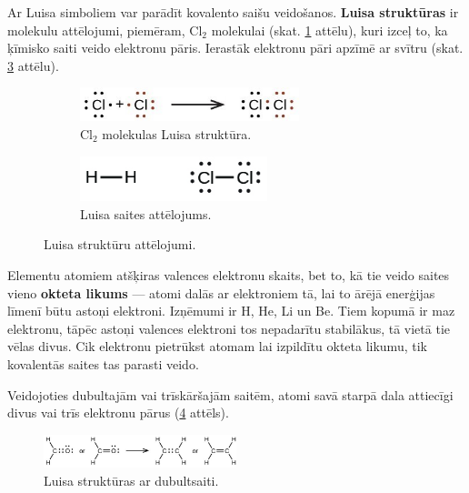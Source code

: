 \documentclass[12pt,a4paper]{article}
\newcommand{\figref}[1]{\ref{#1} attēls}
\begin{document}
Ar Luisa simboliem var parādīt kovalento saišu veidošanos. \textbf{Luisa struktūras} ir molekulu attēlojumi, piemēram, Cl$_2$ molekulai (skat. \ref{fig:cl_bonding} attēlu), kuri izceļ to, ka ķīmisko saiti veido elektronu pāris. Ierastāk elektronu pāri apzīmē ar svītru (skat. \ref{fig:luisa_saite} attēlu).

\begin{figure}[H]
    \centering
    \begin{subfigure}[b]{0.45\textwidth}
        \centering
        \includegraphics[width=0.7\textwidth]{atteli/Cl_bonding_edited.jpg}
        \caption{Cl$_2$ molekulas Luisa struktūra.}
        \label{fig:cl_bonding}
    \end{subfigure}
    \hfill
    \begin{subfigure}[b]{0.45\textwidth}
        \centering
        \includegraphics[width=0.6\textwidth]{atteli/Luisa_saite.jpg}
        \caption{Luisa saites attēlojums.}
        \label{fig:luisa_saite}
    \end{subfigure}
    \caption{Luisa struktūru attēlojumi.}
\end{figure}

Elementu atomiem atšķiras valences elektronu skaits, bet to, kā tie veido saites vieno \textbf{okteta likums} --- atomi dalās ar elektroniem tā, lai to ārējā enerģijas līmenī būtu astoņi elektroni. Izņēmumi ir H, He, Li un Be. Tiem kopumā ir maz elektronu, tāpēc astoņi valences elektroni tos nepadarītu stabilākus, tā vietā tie vēlas divus. Cik elektronu pietrūkst atomam lai izpildītu okteta likumu, tik kovalentās saites tas parasti veido.

Veidojoties dubultajām vai trīskāršajām saitēm, atomi savā starpā dala attiecīgi divus vai trīs elektronu pārus (\figref{fig:dubultsaite}).

\begin{figure}[H]
    \centering
    \includegraphics[width=0.5\textwidth]{atteli/dubultsaite.jpg}
    \caption{Luisa struktūras ar dubultsaiti.}
    \label{fig:dubultsaite}
\end{figure}
\end{document}
